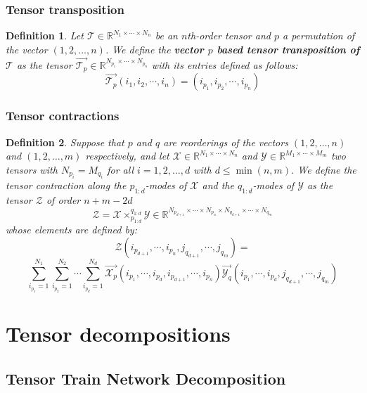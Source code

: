 \documentclass[11pt,a4paper,openright,oneside]{book}
\numberwithin{equation}{section}
\newtheorem{defn0}{Definition}[chapter]
\newenvironment{definition}{ \begin{defn0}}{\end{defn0}}
\begin{document}
\subsection*{Tensor transposition}
\begin{definition}
     Let $\mathcal{T} \in \mathbb{R}^{N_1 \times \cdots \times N_n}$
    be an $n$th-order tensor and $p$ a permutation of the vector $(1, 2, \dots, n)$. We define the \textbf{vector $p$ based tensor
    transposition of $\mathcal{T}$} as the tensor $\overrightarrow{\mathcal{T}_p} \in \mathbb{R}^{N_{p_1} \times \cdots \times N_{p_n}}$ with its entries defined as follows:
    $$\overrightarrow{\mathcal{T}_p}(i_1, i_2, \cdots, i_n) = (i_{p_1}, i_{p_2}, \cdots, i_{p_n})$$
\end{definition}

\subsection*{Tensor contractions}
\begin{definition}
     Suppose that $p$ and $q$ are reorderings of the vectors
    $(1,2,\dots,n)$ and $(1,2,\dots,m)$ respectively, and let ${\mathcal{X} \in \mathbb{R}^{N_1 \times \cdots \times N_n}}$ 
    and $\mathcal{Y} \in \mathbb{R}^{M_1 \times \cdots \times M_m}$ two tensors with $N_{p_i} = M_{q_i}$ for all $i = 1,2,\dots,d$
    with $d \leqslant \min{(n, m)}$. We define the tensor contraction along the $p_{1:d}$-modes of $\mathcal{X}$ and the $q_{1:d}$-modes
    of $\mathcal{Y}$ as the tensor $\mathcal{Z}$ of order $n + m - 2d$
$$\mathcal{Z} = \mathcal{X} \times_{p_{1:d}}^{q_{1:d}} \mathcal{Y} \in \mathbb{R}^{N_{p_{d+1}} \times \cdots \times N_{p_{n}} \times N_{q_{d+1}} \times \cdots \times N_{q_m}}$$
whose elements are defined by:
$$\mathcal{Z}(i_{p_{d+1}}, \cdots, i_{p_n}, j_{q_{d+1}}, \cdots, j_{q_m}) = $$$$ \sum_{i_{p_1} = 1}^{N_1} \sum_{i_{p_2} = 1}^{N_2} \cdots \sum_{i_{p_d} = 1}^{N_d}
\overrightarrow{\mathcal{X}_p}(i_{p_1}, \cdots, i_{p_d}, i_{p_{d+1}}, \cdots, i_{p_n}) \overrightarrow{\mathcal{Y}_q}(i_{p_1}, \cdots, i_{p_d}, j_{q_{d+1}}, \cdots, j_{q_m})$$
\end{definition}


\chapter{Tensor decompositions}

\section{Tensor Train Network Decomposition}
\end{document}
